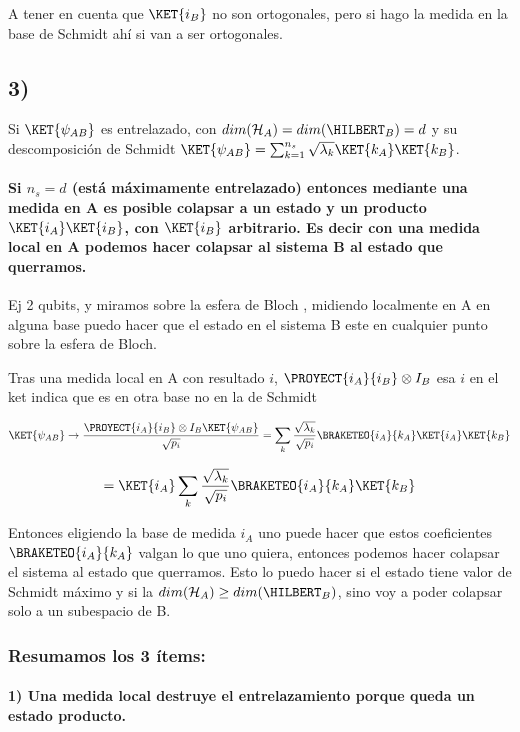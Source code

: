 A tener en cuenta que $\KET{i_{B}}$ no son ortogonales, pero si hago
la medida en la base de Schmidt ahí si van a ser ortogonales. 

\subsection*{3) }

Si $\KET{\psi_{AB}}$ es entrelazado, con $dim(\mathcal{H}_{A})=dim(\HILBERT_{B})=d$
y su descomposición de Schmidt $\KET{\psi_{AB}}=\sum_{k=1}^{n_{s}}\sqrt{\lambda_{k}}\KET{k_{A}}\KET{k_{B}}$.

\paragraph*{Si $n_{s}=d$ (está máximamente entrelazado) entonces mediante una
medida en A es posible colapsar a un estado y un producto $\protect\KET{i_{A}}\protect\KET{i_{B}}$,
con $\protect\KET{i_{B}}$ arbitrario. Es decir con una medida local
en A podemos hacer colapsar al sistema B al estado que querramos. }

Ej 2 qubits, y miramos sobre la esfera de Bloch , midiendo localmente
en A en alguna base puedo hacer que el estado en el sistema B este
en cualquier punto sobre la esfera de Bloch.

Tras una medida local en A con resultado $i$, $\PROYECT{i_{A}}{i_{B}}\otimes I_{B}$
esa $i$ en el ket indica que es en otra base no en la de Schmidt

\[
\KET{\psi_{AB}}\rightarrow\frac{\PROYECT{i_{A}}{i_{B}}\otimes I_{B}\KET{\psi_{AB}}}{\sqrt{p_{i}}}=\sum_{k}\frac{\sqrt{\lambda_{k}}}{\sqrt{p_{i}}}\BRAKETEO{i_{A}}{k_{A}}\KET{i_{A}}\KET{k_{B}}
\]

\[
=\KET{i_{A}}\sum_{k}\frac{\sqrt{\lambda_{k}}}{\sqrt{p_{i}}}\BRAKETEO{i_{A}}{k_{A}}\KET{k_{B}}
\]

Entonces eligiendo la base de medida $i_{A}$ uno puede hacer que
estos coeficientes $\BRAKETEO{i_{A}}{k_{A}}$ valgan lo que uno quiera,
entonces podemos hacer colapsar el sistema al estado que querramos.
Esto lo puedo hacer si el estado tiene valor de Schmidt máximo y si
la $dim(\mathcal{H}_{A})\geq dim(\HILBERT_{B})$, sino voy a poder
colapsar solo a un subespacio de B. 

\subsubsection*{Resumamos los 3 ítems:}

\paragraph*{1) Una medida local destruye el entrelazamiento porque queda un estado
producto.}

